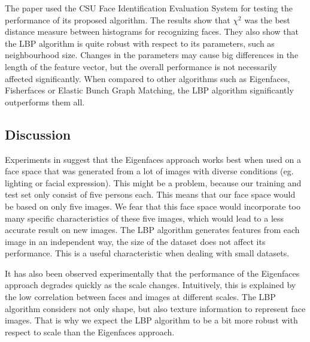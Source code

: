 \documentclass[]{article}
\begin{document}
The paper used the CSU Face Identification Evaluation System for testing the performance of its proposed algorithm. The results show that $\chi^2$ was the best distance measure between histograms for recognizing faces. They also show that the LBP algorithm is quite robust with respect to its parameters, such as neighbourhood size. Changes in the parameters may cause big differences in the length of the feature vector, but the overall performance is not necessarily affected significantly. When compared to other algorithms such as Eigenfaces, Fisherfaces or Elastic Bunch Graph Matching, the LBP algorithm significantly outperforms them all.

\subsection{Discussion}
Experiments in \cite{chang2005evaluation} suggest that the Eigenfaces approach works best when used on a face space that was generated from a lot of images with diverse conditions (eg. lighting or facial expression). This might be a problem, because our training and test set only consist of five persons each. This means that our face space would be based on only five images. We fear that this face space would incorporate too many specific characteristics of these five images, which would lead to a less accurate result on new images. The LBP algorithm generates features from each image in an independent way, the size of the dataset does not affect its performance. This is a useful characteristic when dealing with small datasets.

It has also been observed experimentally that the performance of the Eigenfaces approach degrades quickly as the scale changes. Intuitively, this is explained by the low correlation between faces and images at different scales. The LBP algorithm considers not only shape, but also texture information to represent face images. That is why we expect the LBP algorithm to be a bit more robust with respect to scale than the Eigenfaces approach.

\end{document}
